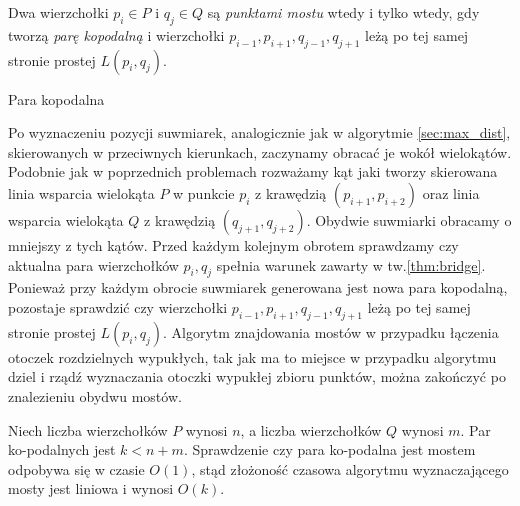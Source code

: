 \begin{twierdzenie}
\label{thm:bridge}
  Dwa wierzchołki $p_i \in P$ i $q_j \in Q$ są \emph{punktami mostu}
  wtedy i tylko wtedy, gdy tworzą \emph{parę kopodalną} i wierzchołki
  $p_{i-1}, p_{i+1}, q_{j-1}, q_{j+1}$ leżą po tej samej stronie
  prostej $L(p_i, q_j)$.
\end{twierdzenie}

\begin{definicja}
  Para kopodalna
\end{definicja}

Po wyznaczeniu pozycji suwmiarek, analogicznie jak w algorytmie
\ref{sec:max_dist}, skierowanych w przeciwnych kierunkach, zaczynamy
obracać je wokół wielokątów. Podobnie jak w poprzednich problemach
rozważamy kąt jaki tworzy skierowana linia wsparcia wielokąta $P$ w
punkcie $p_i$ z krawędzią $(p_{i+1}, p_{i+2})$ oraz linia wsparcia
wielokąta $Q$ z krawędzią $(q_{j+1}, q_{j+2})$. Obydwie suwmiarki
obracamy o mniejszy z tych kątów. Przed każdym kolejnym obrotem
sprawdzamy czy aktualna para wierzchołków $p_i, q_j$ spełnia warunek
zawarty w tw.\ref{thm:bridge}. Ponieważ przy każdym obrocie suwmiarek
generowana jest nowa para kopodalną, pozostaje sprawdzić czy
wierzchołki $p_{i-1}, p_{i+1}, q_{j-1}, q_{j+1}$ leżą po tej samej
stronie prostej $L(p_i, q_j)$. Algorytm znajdowania mostów w przypadku
łączenia otoczek rozdzielnych wypukłych, tak jak ma to miejsce w
przypadku algorytmu dziel i rządź wyznaczania otoczki wypukłej zbioru
punktów, można zakończyć po znalezieniu obydwu mostów.

Niech liczba wierzchołków $P$ wynosi $n$, a liczba wierzchołków $Q$
wynosi $m$. Par ko-podalnych jest $k < n + m$. Sprawdzenie czy para
ko-podalna jest mostem odpobywa się w czasie $O(1)$, stąd złożoność
czasowa algorytmu wyznaczającego mosty jest liniowa i wynosi $O(k)$.

